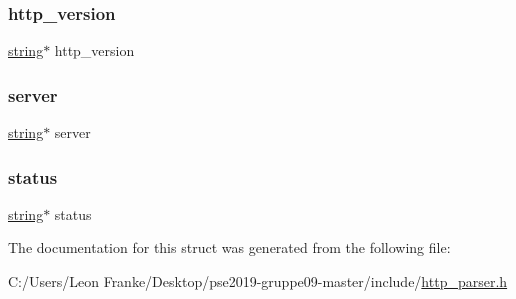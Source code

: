 \mbox{\label{structhttp__response_aa2fa632b89e408825ab17250da007e81}} 
\subsubsection{\texorpdfstring{http\+\_\+version}{http\_version}}
{\footnotesize\ttfamily \mbox{\hyperlink{structstring}{string}}$\ast$ http\+\_\+version}

\mbox{\label{structhttp__response_a1034f43729236ac30a1bca5b95ec5b03}} 
\subsubsection{\texorpdfstring{server}{server}}
{\footnotesize\ttfamily \mbox{\hyperlink{structstring}{string}}$\ast$ server}

\mbox{\label{structhttp__response_ae7c13e8986edbc2ab93ae3bca1c4dc78}} 
\subsubsection{\texorpdfstring{status}{status}}
{\footnotesize\ttfamily \mbox{\hyperlink{structstring}{string}}$\ast$ status}



The documentation for this struct was generated from the following file\+:\begin{DoxyCompactItemize}
\item 
C\+:/\+Users/\+Leon Franke/\+Desktop/pse2019-\/gruppe09-\/master/include/\mbox{\hyperlink{http__parser_8h}{http\+\_\+parser.\+h}}\end{DoxyCompactItemize}
